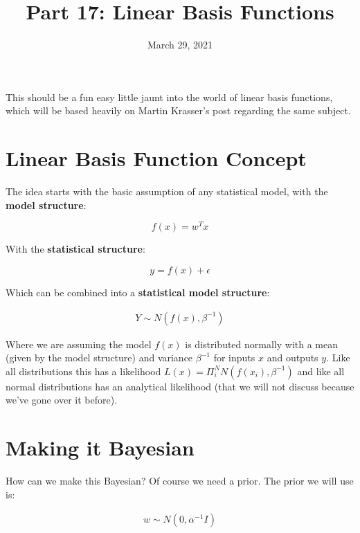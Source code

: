 \documentclass[12pt]{article}
\title{Part 17: Linear Basis Functions}
\begin{document}
\date{March 29, 2021}
\maketitle

This should be a fun easy little jaunt into the world of linear basis functions, which will be based heavily on Martin Krasser's post regarding the same subject.

\section{Linear Basis Function Concept}

The idea starts with the basic assumption of any statistical model, with the \textbf{model structure}:

\begin{equation}
f(x)=w^Tx
\end{equation}

\vspace{5mm}

With the \textbf{statistical structure}:

\begin{equation}
y=f(x)+\epsilon
\end{equation}

\vspace{5mm}

Which can be combined into a \textbf{statistical model structure}:

\begin{align*}
Y \sim N(f(x),\beta^{-1})
\end{align*}

\vspace{5mm}

Where we are assuming the model $f(x)$ is distributed normally with a mean (given by the model structure) and variance $\beta^{-1}$ for inputs $x$ and outputs $y$. Like all distributions this has a likelihood $L(x)=\Pi_i^N N(f(x_i),\beta^{-1})$ and like all normal distributions has an analytical likelihood (that we will not discuss because we've gone over it before).

\section{Making it Bayesian}

How can we make this Bayesian? Of course we need a prior. The prior we will use is:

\begin{align*}
w \sim N(0,\alpha^{-1} I)
\end{align*}
\end{document}
